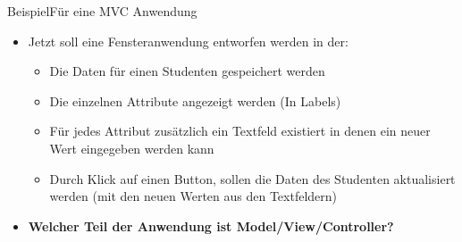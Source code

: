 \begin{frame}{Beispiel}{Für eine MVC Anwendung}
    \begin{itemize}
        \item Jetzt soll eine Fensteranwendung entworfen werden in der:
        \begin{itemize}
            \item Die Daten für einen Studenten gespeichert werden
            \item Die einzelnen Attribute angezeigt werden (In Labels)
            \item Für jedes Attribut zusätzlich ein Textfeld existiert in denen ein neuer Wert eingegeben werden kann
            \item Durch Klick auf einen Button, sollen die Daten des Studenten aktualisiert werden (mit den neuen Werten aus den Textfeldern)
        \end{itemize}
        \item \textbf{Welcher Teil der Anwendung ist Model/View/Controller?}
    \end{itemize}
\end{frame}